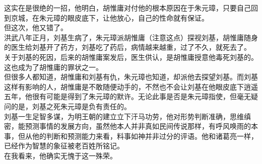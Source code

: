 \begin{multicols}{\theparacolNo}
这实在是很绝的一招，他明白，胡惟庸对付他的根本原因在于朱元璋，只要自己回到京城，在朱元璋的眼皮底下，让他放心，自己的性命就有保证。\\

但这次，他又错了。\\

洪武八年正月，刘基生病了，朱元璋派胡惟庸（注意这点）探视刘基，胡惟庸随身的医生给刘基开了药方，刘基吃了药后，病情越来越重，过了不久，就死去了。\\

关于刘基的死因，后来的胡惟庸案发后，医生供认，是胡惟庸授意他毒死刘基的。这也成为了胡惟庸的罪状之一。\\

但很多人都知道，胡惟庸和刘基有仇，朱元璋也知道，却派他去探望刘基。而刘基这样有影响的人，胡惟庸是不敢随便动手的，不然也不会让刘基在他眼皮底下逍遥五年，他很有可能是得到了朱元璋的默许。无论此事是否是朱元璋指使，但毫无疑问的是，刘基之死朱元璋是负有责任的。\\

刘基一生足智多谋，为明王朝的建立立下汗马功劳，他对形势判断准确，思维缜密，能预测事情的发展方向，虽然他本人并非真如民间传说那样，有呼风唤雨的本事，但从他的判断和预测能力来看，料事如神并非过分的评语。他和诸葛亮一样，已经作为智慧的象征被老百姓所铭记。\\

在我看来，他确实无愧于这一殊荣。\\
\ifnum{}
	\end{multicols}
\fi
\newpage
